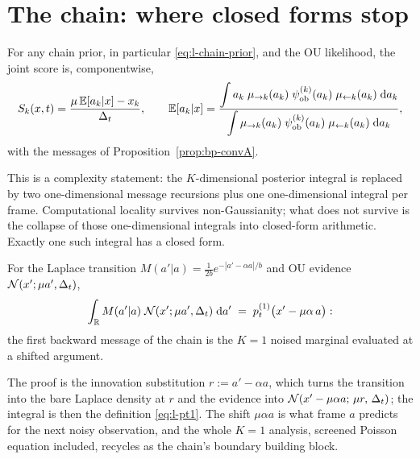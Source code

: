 \section{The chain: where closed forms stop}\label{sec:l-chain}

\begin{theorem}\label{thm:l-markov-score}
For any chain prior, in particular \eqref{eq:l-chain-prior}, and the OU
likelihood, the joint score is, componentwise,
\begin{equation}
  S_k(x, t) = \frac{\mu\, \mathbb{E}[a_k | x] - x_k}{\Delta_t},
  \qquad
  \mathbb{E}[a_k | x]
  = \frac{\displaystyle\int a_k\; \mu_{\to k}(a_k)\;
      \psi^{(k)}_{\mathrm{ob}}(a_k)\;
      \mu_{\leftarrow k}(a_k)\;\mathrm{d} a_k}
     {\displaystyle\int \mu_{\to k}(a_k)\;
      \psi^{(k)}_{\mathrm{ob}}(a_k)\;
      \mu_{\leftarrow k}(a_k)\;\mathrm{d} a_k},
  \label{eq:l-markov-score}
\end{equation}
with the messages of Proposition~\ref{prop:bp-convA}.
\end{theorem}

This is a complexity statement: the $K$-dimensional posterior integral is
replaced by two one-dimensional message recursions plus one
one-dimensional integral per frame. Computational locality survives
non-Gaussianity; what does not survive is the collapse of those
one-dimensional integrals into closed-form arithmetic. Exactly one such
integral has a closed form.

\begin{proposition}\label{prop:l-onestep}
For the Laplace transition $M(a'|a) = \frac{1}{2b} e^{-|a' - \alpha a|/b}$
and OU evidence $\mathcal{N}(x'; \mu a', \Delta_t)$,
\begin{equation}
  \int_{\mathbb{R}} M(a' | a)\; \mathcal{N}(x'; \mu a', \Delta_t)\; \mathrm{d} a'
  \;=\; p_t^{(1)}\big( x' - \mu\alpha\, a \big) :
  \label{eq:l-onestep}
\end{equation}
the first backward message of the chain is the $K = 1$ noised marginal
evaluated at a shifted argument.
\end{proposition}

The proof is the innovation substitution $r := a' - \alpha a$, which
turns the transition into the bare Laplace density at $r$ and the
evidence into $\mathcal{N}(x' - \mu\alpha a;\, \mu r,\, \Delta_t)$; the integral
is then the definition \eqref{eq:l-pt1}. The shift $\mu\alpha a$ is what
frame $a$ predicts for the next noisy observation, and the whole $K = 1$
analysis, screened Poisson equation included, recycles as the chain's
boundary building block.

